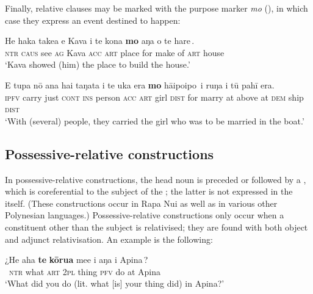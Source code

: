 Finally, relative clauses may be marked with the purpose marker \textit{mo} (), in which case they express an event destined to happen:

\ea\label{ex:11.120}
\gll He haka take{\ꞌ}a e Kava i te kona {\ob}\textbf{mo} aŋa o te hare\,{\cb}. \\
\textsc{ntr} \textsc{caus} see \textsc{ag} Kava \textsc{acc} \textsc{art} place {\db}for make of \textsc{art} house \\

\glt 
‘Kava showed (him) the place to build the house.’ \textstyleExampleref{[R229.217]} 
\z

\ea\label{ex:11.121}
\gll E tupa nō {\ꞌ}ana hai taŋata i te uka era {\ob}\textbf{mo} hāipoipo\,{\cb}  {\ꞌ}i ruŋa i tū pahī era.\\
\textsc{ipfv} carry just \textsc{cont} \textsc{ins} person \textsc{acc} \textsc{art} girl \textsc{dist} {\db}for marry  at above at \textsc{dem} ship \textsc{dist}\\

\glt 
‘With (several) people, they carried the girl who was to be married in the boat.’ \textstyleExampleref{[R539-3.034]}
\z

\subsection{Possessive-relative constructions}\label{sec:11.4.4}

In possessive-relative constructions, the head noun is preceded or followed by a , which is coreferential to the subject of the ; the latter is not expressed in the  itself. (These constructions occur in Rapa Nui as well as in various other Polynesian languages.) Possessive-relative constructions only occur when a constituent other than the subject is relativised; they are found with both object and adjunct relativisation. An example is the following:

\ea\label{ex:11.122}
\gll ¿He aha \textbf{te} \textbf{kōrua} me{\ꞌ}e {\ob}i aŋa {\ꞌ}i {\ꞌ}Apina\,{\cb}? \\
~\textsc{ntr} what \textsc{art} \textsc{2pl} thing {\db}\textsc{pfv} do at Apina \\

\glt
‘What did you do (lit. what [is] your thing did) in Apina?’ \textstyleExampleref{[R301.197]} 
\z


